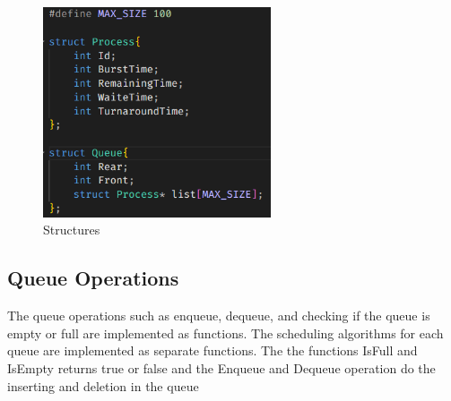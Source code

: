\documentclass{article}
\begin{document}
\begin{figure}[h]
    \centering
    \includegraphics[width=0.6\textwidth,]{1.png}
    \caption{Structures}
    \label{fig:example}
\end{figure}

\newpage
\subsection{Queue Operations}
\vspace{\baselineskip}
The queue operations such as enqueue, dequeue, and checking if the queue is empty or full are implemented as functions.
The scheduling algorithms for each queue are implemented as separate functions.
The the functions IsFull and IsEmpty returns true or false and the Enqueue and Dequeue operation do the inserting and deletion in the queue
\end{document}
